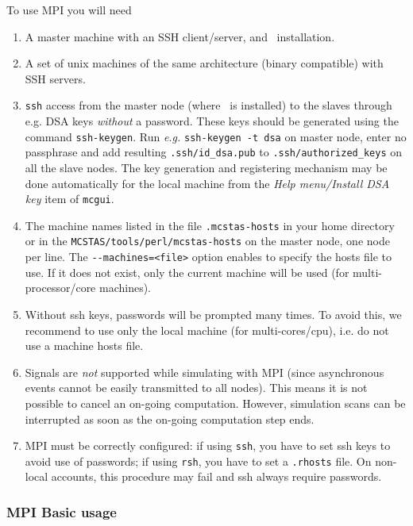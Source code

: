 To use MPI you will need
  \begin{enumerate}
  \item{A master machine with an SSH client/server, and \MCS\ installation.}
  \item{A set of unix machines of the same architecture (binary compatible) with
      SSH servers.}
  \item{ \texttt{ssh} access from the master node (where \MCS\ is
      installed) to the slaves through e.g. DSA keys \emph{without} a
      password. These keys should be generated using the command
      \texttt{ssh-keygen}. Run \emph{e.g.} \texttt{ssh-keygen -t dsa} on
      master node, enter no passphrase and add resulting
      \texttt{.ssh/id\_dsa.pub} to \texttt{.ssh/authorized\_keys}
      on all the slave nodes. The key generation and registering mechanism
      may be done automatically for the local machine from the
      \emph{Help menu/Install DSA key} item of \verb+mcgui+.}
  \item{The machine names listed in the file \texttt{.mcstas-hosts} in
      your home directory or in the \texttt{MCSTAS/tools/perl/mcstas-hosts} on
      the master node, one node per line. The \verb'--machines=<file>' option
      enables to specify the hosts file to use. If it does not exist, only
      the current machine will be used (for multi-processor/core machines).}
  \item{Without ssh keys, passwords will be prompted many times. To avoid this,
      we recommend to use only the local machine (for multi-cores/cpu), i.e. do
      not use a machine hosts file.}
  \item Signals are \emph{not} supported while simulating with MPI (since
    asynchronous events cannot be easily transmitted to all nodes). This
    means it is not possible to cancel an on-going computation. However,
    simulation scans can be interrupted as soon as the on-going computation
    step ends.
  \item MPI must be correctly configured: if using \verb'ssh', you
    have to set ssh keys to avoid use of passwords; if
    using \verb'rsh', you have to set a \verb'.rhosts' file.
    On non-local accounts, this procedure may fail and ssh always require passwords.
  \end{enumerate}

\subsubsection{MPI Basic usage}

